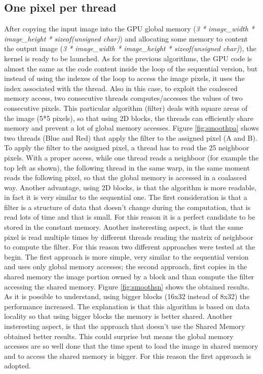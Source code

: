 \documentclass[a4paper]{article}
\begin{document}
\subsection{One pixel per thread}
\label{sec:opts}
After copying the input image into the GPU global memory (\textit{3 * image\_width * image\_height * sizeof(unsigned char)}) and allocating some memory to content the output image (\textit{3 * image\_width * image\_height * sizeof(unsigned char)}), the kernel is ready to be launched. As for the previous algorithms, the GPU code is almost the same as the code content inside the loop of the sequential version, but instead of using the indexes of the loop to access the image pixels, it uses the index associated with the thread. Also in this case, to exploit the coalesced memory access, two consecutive threads computes/accesses the values of two consecutive pixels.
This particular algorithm (filter) deals with square areas of the image (5*5 pixels), so that using 2D blocks, the threads can efficiently share memory and prevent a lot of global memory accesses. Figure \ref{fig:smoothpa} shows two threads (Blue and Red) that apply the filter to the assigned pixel (A and B). To apply the filter to the assigned pixel, a thread has to read the 25 neighboor pixels. With a proper access, while one thread reads a neighboor (for example the top left as shown), the following thread in the same warp, in the same moment reads the following pixel, so that the global memory is accessed in a coalasced way. Another advantage, using 2D blocks, is that the algorithm is more readable, in fact it is very similar to the sequential one. The first consideration is that a filter is a structure of data that doesn't change during the computation, that is read lots of time and that is small. For this reason it is a perfect candidate to be stored in the constant memory. Another insteresting aspect, is that the same pixel is read multiple times by different threads reading the matrix of neighboor to compute the filter. For this reason two different approaches were tested at the begin. The first approach is more simple, very similar to the sequential version and uses only global memory accesses; the second approach, first copies in the shared memory the image portion owned by a block and than compute the filter accessing the shared memory. Figure \ref{fig:smoothsn} shows the obtained results. As it is possible to understand, using bigger blocks (16x32 instead of 8x32) the performance increased. The explanation is that this algorithm is based on data locality so that using bigger blocks the memory is better shared. Another insteresting aspect, is that the approach that doesn't use the Shared Memory obtained better results. This could surprise but means the global memory accesses are so well done that the time spent to load the image in shared memory and to access the shared memory is bigger. For this reason the first approach is adopted.
\end{document}
